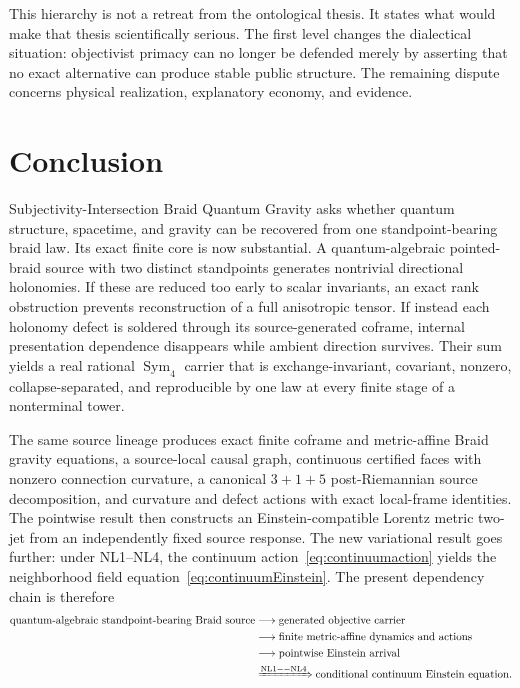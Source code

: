 \documentclass[11pt]{article}
\theoremstyle{definition}
\theoremstyle{remark}
\newcommand{\Sym}{\operatorname{Sym}}
\begin{document}
This hierarchy is not a retreat from the ontological thesis. It states what would make that thesis scientifically serious. The first level changes the dialectical situation: objectivist primacy can no longer be defended merely by asserting that no exact alternative can produce stable public structure. The remaining dispute concerns physical realization, explanatory economy, and evidence.

\section{Conclusion}

Subjectivity-Intersection Braid Quantum Gravity asks whether quantum structure, spacetime, and gravity can be recovered from one standpoint-bearing braid law. Its exact finite core is now substantial. A quantum-algebraic pointed-braid source with two distinct standpoints generates nontrivial directional holonomies. If these are reduced too early to scalar invariants, an exact rank obstruction prevents reconstruction of a full anisotropic tensor. If instead each holonomy defect is soldered through its source-generated coframe, internal presentation dependence disappears while ambient direction survives. Their sum yields a real rational $\Sym_4$ carrier that is exchange-invariant, covariant, nonzero, collapse-separated, and reproducible by one law at every finite stage of a nonterminal tower.

The same source lineage produces exact finite coframe and metric-affine Braid gravity equations, a source-local causal graph, continuous certified faces with nonzero connection curvature, a canonical $3+1+5$ post-Riemannian source decomposition, and curvature and defect actions with exact local-frame identities. The pointwise result then constructs an Einstein-compatible Lorentz metric two-jet from an independently fixed source response. The new variational result goes further: under NL1--NL4, the continuum action~\eqref{eq:continuumaction} yields the neighborhood field equation~\eqref{eq:continuumEinstein}. The present dependency chain is therefore
\[
 \begin{aligned}
 \text{quantum-algebraic standpoint-bearing Braid source}
 &\longrightarrow \text{generated objective carrier}\\
 &\longrightarrow \text{finite metric-affine dynamics and actions}\\
 &\longrightarrow \text{pointwise Einstein arrival}\\
 &\xRightarrow{\mathrm{NL1--NL4}} \text{conditional continuum Einstein equation}.
 \end{aligned}
\]
\end{document}
